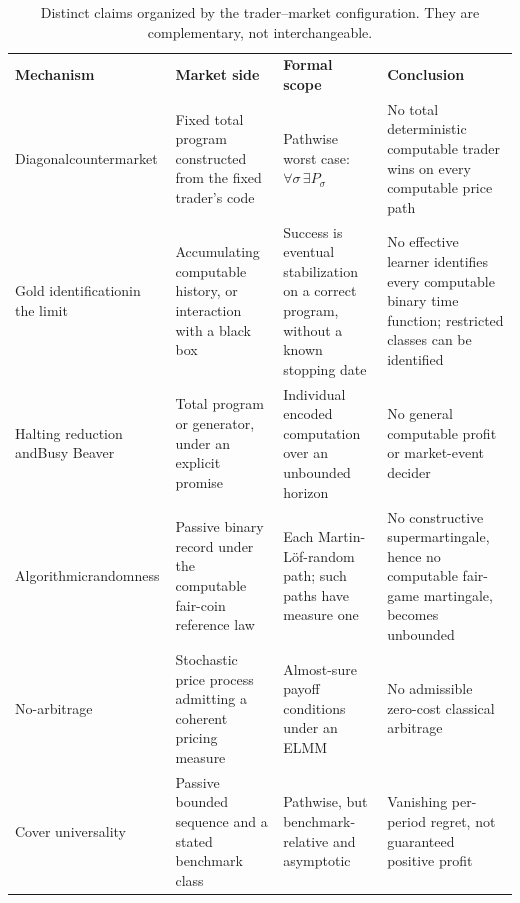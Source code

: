 \documentclass[aps,pra,reprint,superscriptaddress,amsmath,amssymb,floatfix]{revtex4-2}
\theoremstyle{plain}
\theoremstyle{definition}
\theoremstyle{remark}
\begin{document}
\begin{table}[t]
\caption{\label{tab:claimmap}Distinct claims organized by the trader--market
configuration. They are complementary, not interchangeable.}
\centering
\begin{ruledtabular}
\begin{tabular}{p{}p{}p{}p{}}
\textbf{Mechanism} & \textbf{Market side} & \textbf{Formal scope}
& \textbf{Conclusion} \\
\colrule
Diagonal\newline\mbox{countermarket}
& Fixed total program constructed from the fixed trader's code
& Pathwise worst case:
\(\forall\sigma\,\exists P_\sigma\)
& No total deterministic computable trader wins on every computable price path \\
Gold identification\newline in the limit
& Accumulating computable history, or interaction with a black box
& Success is eventual stabilization on a correct program, without a known
stopping date
& No effective learner identifies every computable binary time function;
restricted classes can be identified \\
Halting reduction and\newline Busy Beaver
& Total program or generator, under an explicit promise
& Individual encoded computation over an unbounded horizon
& No general computable profit or market-event decider \\
Algorithmic\newline randomness
& Passive binary record under the computable fair-coin reference law
& Each Martin-L\"of-random path; such paths have measure one
& No constructive supermartingale, hence no computable fair-game martingale,
becomes unbounded \\
No-arbitrage
& Stochastic price process admitting a coherent pricing measure
& Almost-sure payoff conditions under an ELMM
& No admissible zero-cost classical arbitrage \\
Cover universality
& Passive bounded sequence and a stated benchmark class
& Pathwise, but benchmark-relative and asymptotic
& Vanishing per-period regret, not guaranteed positive profit \\
\end{tabular}
\end{ruledtabular}
\end{table}
\end{document}
